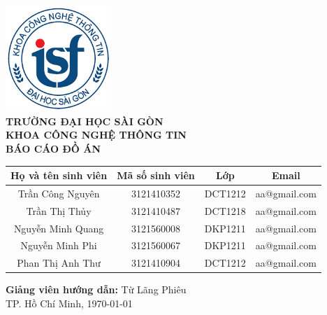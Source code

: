 \documentclass[a4paper,12pt]{report}
\begin{document}
\begin{titlepage}
    \centering
    \includegraphics[width=4cm]{imgs/logoITSGU.png} \\[1cm]
    \textbf{\Large TRƯỜNG ĐẠI HỌC SÀI GÒN} \\[0.5cm]
    \textbf{\Large KHOA CÔNG NGHỆ THÔNG TIN} \\[2cm]
    {\Huge \textbf{BÁO CÁO ĐỒ ÁN}} \\[2cm]

    \begin{center}
        \begin{tabular}{|c|c|c|c|}
            \hline
            \textbf{Họ và tên sinh viên} & \textbf{Mã số sinh viên} & \textbf{Lớp} & \textbf{Email} \\
            \hline
            Trần Công Nguyên & 3121410352 & DCT1212 & aa@gmail.com \\
            \hline
            Trần Thị Thủy & 3121410487 & DCT1218 & aa@gmail.com \\
            \hline
            Nguyễn Minh Quang & 3121560008 & DKP1211 & aa@gmail.com \\
            \hline
            Nguyễn Minh Phi & 3121560067 & DKP1211 & aa@gmail.com \\
            \hline
            Phan Thị Anh Thư & 3121410904 & DCT1212 & aa@gmail.com \\
            \hline
        \end{tabular}
    \end{center}
    
    \vspace{1cm}
    \textbf{Giảng viên hướng dẫn:} Từ Lãng Phiêu \\

    \vfill
    TP. Hồ Chí Minh, \today
\end{titlepage}

\newpage
\tableofcontents
\newpage








\end{document}
